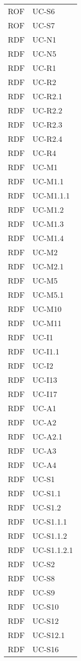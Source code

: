 \begin{longtable}{| p{5cm} | p{5cm} |}
		ROF & UC-S6\\
		ROF & UC-S7\\
		
		
		
		
		
		
		
		RDF & UC-N1\\
		RDF & UC-N5\\
		
		RDF & UC-R1 \\
		RDF & UC-R2\\
		RDF & UC-R2.1\\
		RDF & UC-R2.2\\
		\rowcolor{LightGray}
		RDF & UC-R2.3\\
		RDF & UC-R2.4\\
		RDF & UC-R4\\
		
		RDF & UC-M1\\
		RDF & UC-M1.1 \\
		RDF & UC-M1.1.1 \\
		RDF & UC-M1.2 \\
		RDF & UC-M1.3 \\
		RDF & UC-M1.4 \\
		RDF & UC-M2 \\
		RDF & UC-M2.1 \\
		\rowcolor{LightGray}
		RDF & UC-M5 \\
		RDF & UC-M5.1 \\	
		RDF & UC-M10\\
		RDF & UC-M11\\			
		
		RDF & UC-I1\\
		RDF & UC-I1.1\\
		RDF & UC-I2 \\
		RDF & UC-I13 \\
		RDF & UC-I17\\
		
		RDF & UC-A1\\
		RDF & UC-A2\\
		RDF & UC-A2.1\\
		RDF & UC-A3\\
		RDF & UC-A4\\
		
		RDF & UC-S1\\
		RDF & UC-S1.1\\
		RDF & UC-S1.2\\
		\rowcolor{LightGray}
		RDF & UC-S1.1.1\\
		RDF & UC-S1.1.2\\
		RDF & UC-S1.1.2.1 \\
		\rowcolor{LightGray}
		RDF & UC-S2\\
		RDF & UC-S8\\
		RDF & UC-S9\\
		RDF & UC-S10\\
		RDF & UC-S12 \\
		RDF & UC-S12.1 \\
		RDF & UC-S16\\
		

\end{longtable}
